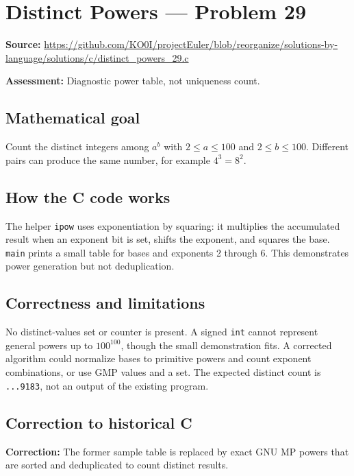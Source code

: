 \section{Distinct Powers --- Problem 29}
\label{prob:29}
\noindent\textbf{Source:} \url{https://github.com/KO0I/projectEuler/blob/reorganize/solutions-by-language/solutions/c/distinct_powers_29.c}

\noindent\textbf{Assessment:} Diagnostic power table, not uniqueness count.

\subsection*{Mathematical goal}
Count the distinct integers among \(a^b\) with \(2\leq a\leq100\) and \(2\leq b\leq100\). Different pairs can produce the same number, for example \(4^3=8^2\).

\subsection*{How the C code works}
The helper \verb|ipow| uses exponentiation by squaring: it multiplies the accumulated result when an exponent bit is set, shifts the exponent, and squares the base. \verb|main| prints a small table for bases and exponents 2 through 6. This demonstrates power generation but not deduplication.

\subsection*{Correctness and limitations}
No distinct-values set or counter is present. A signed \verb|int| cannot represent general powers up to \(100^{100}\), though the small demonstration fits. A corrected algorithm could normalize bases to primitive powers and count exponent combinations, or use GMP values and a set. The expected distinct count is \texttt{...9183}, not an output of the existing program.


\subsection*{Correction to historical C}
{\color{red}\textbf{Correction:} The former sample table is replaced by exact GNU MP powers that are sorted and deduplicated to count distinct results.}
